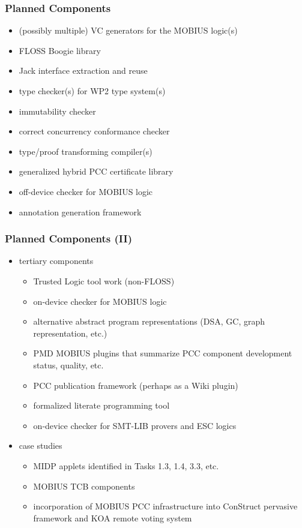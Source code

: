 \documentclass{beamer}
\begin{document}
\begin{frame}\frametitle{Planned Components}
  \begin{itemize}
  \item (possibly multiple) VC generators for the MOBIUS logic(s)
  \item FLOSS Boogie library
  \item Jack interface extraction and reuse
  \item type checker(s) for WP2 type system(s)
  \item immutability checker
  \item correct concurrency conformance checker
  \item type/proof transforming compiler(s)
  \item generalized hybrid PCC certificate library
  \item off-device checker for MOBIUS logic
  \item annotation generation framework
  \end{itemize}
\end{frame}

\begin{frame}\frametitle{Planned Components (II)}
  \begin{itemize}
  \item tertiary components
    \begin{itemize}
    \item Trusted Logic tool work (non-FLOSS)
    \item on-device checker for MOBIUS logic
    \item alternative abstract program representations (DSA, GC, graph
      representation, etc.)
    \item PMD MOBIUS plugins that summarize PCC component development
      status, quality, etc.
    \item PCC publication framework (perhaps as a Wiki plugin)
    \item formalized literate programming tool
    \item on-device checker for SMT-LIB provers and ESC logics
    \end{itemize}
  \item case studies
    \begin{itemize}
    \item MIDP applets identified in Tasks 1.3, 1.4, 3.3, etc.
    \item MOBIUS TCB components
    \item incorporation of MOBIUS PCC infrastructure into ConStruct
      pervasive framework and KOA remote voting system
    \end{itemize}
  \end{itemize}
\end{frame}
\end{document}
